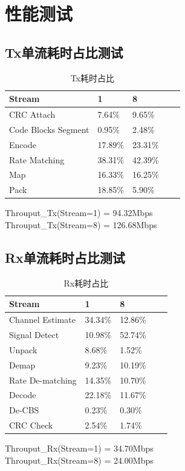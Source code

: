\documentclass{article}
\begin{document}
\section{性能测试}
\subsection{Tx单流耗时占比测试}
\begin{table}[H]
	\caption{Tx耗时占比}
	\centering
	\begin{tabular}{|l|l|l|l|l|}%
		\hline  %
		Stream				& 1			& 8			\\
		\hline
		CRC Attach			& 7.64\%	& 9.65\%	\\
		\hline
		Code Blocks Segment	& 0.95\%	& 2.48\%	\\
		\hline
		Encode				& 17.89\%	& 23.31\%	\\
		\hline
		Rate Matching		& 38.31\%	& 42.39\%	\\
		\hline
		Map					& 16.33\%	& 16.25\%	\\
		\hline
		Pack				& 18.85\%	& 5.90\%	\\
		\hline  %
	\end{tabular}
\end{table}
Throuput\_Tx(Stream=1) = 94.32Mbps\\
Throuput\_Tx(Stream=8) = 126.68Mbps

\subsection{Rx单流耗时占比测试}
\begin{table}[H]
	\caption{Rx耗时占比}
	\centering
	\begin{tabular}{|l|l|l|l|l|}%
		\hline  %
		Stream				& 1			& 8			\\
		\hline
		Channel Estimate	& 34.34\%	& 12.86\%	\\
		\hline
		Signal Detect		& 10.98\%	& 52.74\%	\\
		\hline
		Unpack				& 8.68\%	& 1.52\%	\\
		\hline
		Demap				& 9.23\%	& 10.19\%	\\
		\hline
		Rate De-matching	& 14.35\%	& 10.70\%	\\
		\hline
		Decode				& 22.18\%	& 11.67\%	\\
		\hline
		De-CBS				& 0.23\%	& 0.30\%	\\
		\hline
		CRC Check			& 2.54\%	& 1.74\%	\\
		\hline  %
	\end{tabular}
\end{table}
Throuput\_Rx(Stream=1) = 34.70Mbps \\
Throuput\_Rx(Stream=8) = 24.00Mbps
\end{document}
